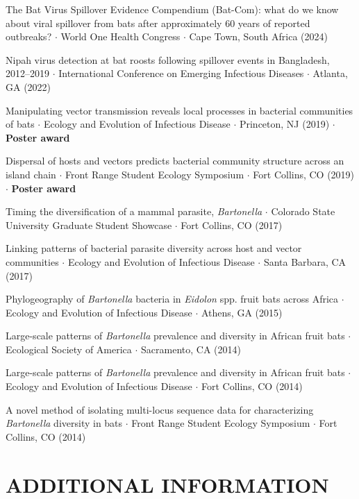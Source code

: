 \documentclass{cv}
\begin{document}
The Bat Virus Spillover Evidence Compendium (Bat-Com): what do we know about viral spillover from bats after approximately 60 years of reported outbreaks? $\cdot$ World One Health Congress $\cdot$ Cape Town, South Africa (2024)

Nipah virus detection at bat roosts following spillover events in Bangladesh, 2012--2019 $\cdot$ International Conference on Emerging Infectious Diseases $\cdot$ Atlanta, GA (2022)

Manipulating vector transmission reveals local processes in bacterial communities of bats $\cdot$ Ecology and Evolution of Infectious Disease $\cdot$ Princeton, NJ (2019) $\cdot$ \textbf{Poster award}

Dispersal of hosts and vectors predicts bacterial community structure across an island chain $\cdot$ Front Range Student Ecology Symposium $\cdot$ Fort Collins, CO (2019) $\cdot$ \textbf{Poster award}

Timing the diversification of a mammal parasite, \textit{Bartonella} $\cdot$ Colorado State University Graduate Student Showcase $\cdot$ Fort Collins, CO (2017)

Linking patterns of bacterial parasite diversity across host and vector communities $\cdot$ Ecology and Evolution of Infectious Disease $\cdot$ Santa Barbara, CA (2017)

Phylogeography of \textit{Bartonella} bacteria in \textit{Eidolon} spp. fruit bats across Africa $\cdot$ Ecology and Evolution of Infectious Disease $\cdot$ Athens, GA (2015)

Large-scale patterns of \textit{Bartonella} prevalence and diversity in African fruit bats $\cdot$ Ecological Society of America $\cdot$ Sacramento, CA (2014)

Large-scale patterns of \textit{Bartonella} prevalence and diversity in African fruit bats $\cdot$ Ecology and Evolution of Infectious Disease $\cdot$ Fort Collins, CO (2014)

A novel method of isolating multi-locus sequence data for characterizing \textit{Bartonella} diversity in bats $\cdot$ Front Range Student Ecology Symposium $\cdot$ Fort Collins, CO (2014)


\section*{ADDITIONAL INFORMATION}
\end{document}
